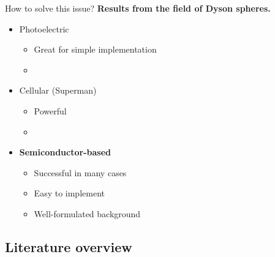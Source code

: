 \begin{frame}[t]{How to solve this issue?}
\textbf{Results from the field of Dyson spheres.}
\bigskip

\begin{itemize}
    \item Photoelectric
    \begin{itemize}
        \smallskip
        \item Great for simple implementation
        \smallskip
        \item {}
    \end{itemize}
    \bigskip
    \item Cellular (Superman)
    \begin{itemize}
        \smallskip
        \item Powerful
        \smallskip
        \item {}
    \end{itemize}
    \bigskip
    \item \textbf{Semiconductor-based}
    \begin{itemize}
        \smallskip
        \item Successful in many cases
        \smallskip
        \item Easy to implement
        \smallskip
        \item Well-formulated background
    \end{itemize}
    \bigskip
\end{itemize}

\end{frame}


\subsection{Literature overview}

